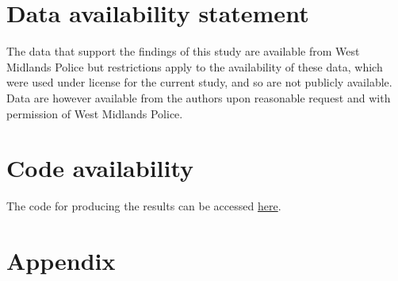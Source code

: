 \documentclass[12pt, letterpaper]{article}
\begin{document}
\section*{Data availability statement}

The data that support the findings of this study are available from West Midlands Police
but restrictions apply to the availability of these data, which were used under license
for the current study, and so are not publicly available. Data are however available
from the authors upon reasonable request and with permission of West Midlands Police.

\section*{Code availability}

The code for producing the results can be accessed \href{https://osf.io/kg9yr/?view_only=172a33b467bd4566b2e5dea0e2f59f8c}{here}. 

\section*{Appendix}

\renewcommand{\thetable}{A\arabic{table}}
\renewcommand{\thefigure}{A\arabic{figure}}
\setcounter{table}{0}
\setcounter{figure}{0}
\end{document}
